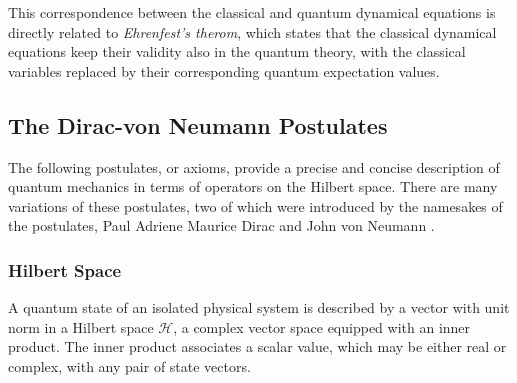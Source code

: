     This correspondence between the classical and quantum dynamical equations is 
    directly related to \emph{Ehrenfest's therom}, which states that the classical 
    dynamical equations keep their validity also in the quantum theory, with the 
    classical variables replaced by their corresponding quantum expectation
    values\cite{ehrenfest1927bemerkung}.

\subsection{The Dirac-von Neumann Postulates}

    The following postulates, or axioms, provide a precise and concise description 
    of quantum mechanics in terms of operators on the Hilbert space. There are
    many variations of these postulates, two of which were introduced by the
    namesakes of the postulates, Paul Adriene Maurice Dirac \cite{dirac1930principles}
    and John von Neumann \cite{vonNeumann1932foundations}.

    \subsubsection{Hilbert Space}
    A quantum state of an isolated physical system is described by a vector
    with unit norm in a Hilbert space $\mathcal{H}$, 
    a complex vector space equipped with an inner product. The inner product 
    associates a scalar value, which may be either real or complex, with any pair
    of state vectors.
    
